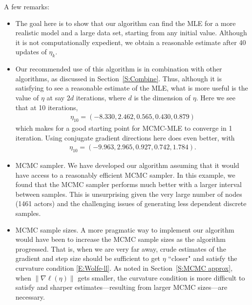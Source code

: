 A few remarks:
\begin{itemize}
\item The goal here is to show that our algorithm can find the MLE for a more realistic model and a large data set, starting from any initial value.
Although it is not computationally expedient, 
we obtain a reasonable estimate after 40 updates of $\eta_k$.

\item Our recommended use of this algorithm is in combination with other algorithms,
as discussed in Section~\ref{S:Combine}.  Thus, although it is satisfying to see a reasonable estimate of the MLE, what is more useful is the value of $\eta$ 
at say $2d$ iterations, where $d$ is the dimension of $\eta$.  
Here we see that at 10 iterations,
\begin{align*}
	\eta_{10} =( -8.330,  2.462,  0.565,  0.430,  0.879) 
\end{align*}
which makes for a good starting point for MCMC-MLE to converge in 1 iteration.
Using conjugate gradient directions here does even better, with
\begin{align*}
	\eta_{10} =( -9.963,  2.965,  0.927,  0.742,  1.784).
\end{align*}
\item MCMC sampler.  We have developed our algorithm assuming that it would have access
to a reasonably efficient MCMC sampler.  In this example, we found that the MCMC
sampler performs much better with a larger interval between samples.  This is unsurprising given the very large number of nodes (1461 actors) 
and the challenging issues of generating less dependent discrete samples.  

\item MCMC sample sizes.  A more pragmatic way to implement our algorithm would have
been to increase the MCMC sample sizes as the algorithm progressed.  That is, when
we are very far away, crude estimates of the gradient and step size should be sufficient
to get $\eta$ ``closer" and satisfy the curvature condition \eqref{E:Wolfe-ll}.
As noted in Section~\ref{S:MCMC approx}, when $\lVert \nabla \ell(\eta) \rVert$ gets
smaller, the curvature condition is more difficult to satisfy and sharper estimates---resulting from larger MCMC sizes---are necessary.
\end{itemize}


 
